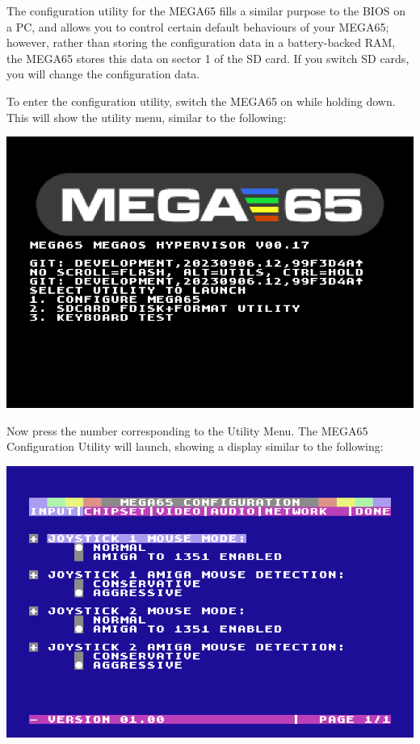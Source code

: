 The configuration utility for the MEGA65 fills a similar purpose to the BIOS on a PC, and allows you to control certain default behaviours of your MEGA65; however, rather than storing the configuration data in a
battery-backed RAM, the MEGA65 stores this data on sector 1 of the SD card. If you switch SD cards, you will change the configuration data.

  To enter the configuration utility, switch the MEGA65 on while
  holding  down.  This will show the utility menu,
  similar to the following:

\begin{center}
  \includegraphics[width=0.9\linewidth]{images/ss-utilmenu.png}
\end{center}

\begin{minipage}{\linewidth}
  Now press the number corresponding to the Utility Menu.  The MEGA65
  Configuration Utility will launch, showing a display similar to
  the following:

  \vspace{5mm}
  \includegraphics[width=\linewidth]{images/ss-m65config-1.png}
\end{minipage}

